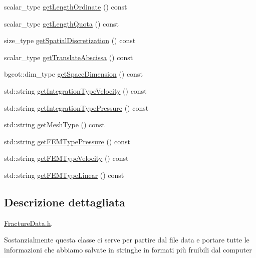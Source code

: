 \begin{DoxyCompactItemize}
\item 
scalar\-\_\-type \hyperlink{classFractureData_a905e953f685b1329ddcc7ee56f8302b1}{get\-Length\-Ordinate} () const 
\item 
scalar\-\_\-type \hyperlink{classFractureData_a79747fff53da9d858950d83ad0114288}{get\-Length\-Quota} () const 
\item 
size\-\_\-type \hyperlink{classFractureData_a5c10d579be7849be1a126c24982f8a23}{get\-Spatial\-Discretization} () const 
\item 
scalar\-\_\-type \hyperlink{classFractureData_a485e084e083d9181750f19db6842a5e0}{get\-Translate\-Abscissa} () const 
\item 
bgeot\-::dim\-\_\-type \hyperlink{classFractureData_a4ead03266295fe14fa3285692f945d89}{get\-Space\-Dimension} () const 
\item 
std\-::string \hyperlink{classFractureData_a8a8a198482de6bf4104746bc1d0510c6}{get\-Integration\-Type\-Velocity} () const 
\item 
std\-::string \hyperlink{classFractureData_a9333d8e89dc92023d97a48c1905ada76}{get\-Integration\-Type\-Pressure} () const 
\item 
std\-::string \hyperlink{classFractureData_aaded6c0452470489beb4ab95b5f4158f}{get\-Mesh\-Type} () const 
\item 
std\-::string \hyperlink{classFractureData_a643b9a8a33405ec7aaa6b5612cb81d57}{get\-F\-E\-M\-Type\-Pressure} () const 
\item 
std\-::string \hyperlink{classFractureData_a7396b67399a1ae8e5550841907c0dcb5}{get\-F\-E\-M\-Type\-Velocity} () const 
\item 
std\-::string \hyperlink{classFractureData_a606c22e054fdb5f8602ce39fa6ae15cc}{get\-F\-E\-M\-Type\-Linear} () const 
\end{DoxyCompactItemize}


\subsection{Descrizione dettagliata}
\hyperlink{FractureData_8h}{Fracture\-Data.\-h}. 

Sostanzialmente questa classe ci serve per partire dal file data e portare tutte le informazioni che abbiamo salvate in stringhe in formati più fruibili dal computer 


